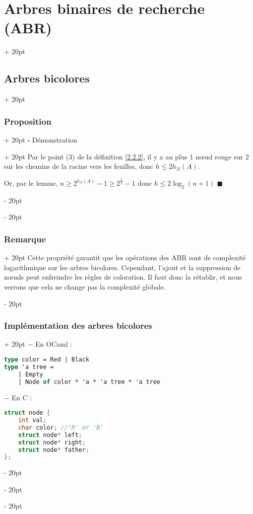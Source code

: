 \documentclass[a4paper, 12pt, twoside]{article}
\renewcommand{\le}{\leqslant}
\renewcommand{\ge}{\geqslant}
\newcommand{\ind}[1][20pt]{\advance\leftskip + #1}
\newcommand{\deind}[1][20pt]{\advance\leftskip - #1}
\newenvironment{indt}[2][20pt]{#2 \par \ind[#1]}{\par \deind} %
\begin{document}
\begin{indt}{\section{Arbres binaires de recherche (ABR)}}
\begin{indt}{\subsection{Arbres bicolores}}
\begin{indt}{\subsubsection{Proposition}}
\begin{indt}{$\square$ Démonstration}
                    Par le point (3) de la définition \ref{2.2.2}, il y a au plus 1 n\oe ud rouge sur 2 sur les chemins de la racine vers les feuilles, donc $h \le 2 h_N(A)$.
                    
                    Or, par le lemme, $n \ge 2^{h_N(A)} - 1 \ge 2^{\frac h 2} - 1$ donc $h \le 2\log_2(n + 1)$ $\blacksquare$
                \end{indt}
            \end{indt}
            
            \vspace{12pt}
            
            \begin{indt}{\subsubsection{Remarque}}
                Cette propriété garantit que les opérations des ABR sont de complexité logarithmique sur les arbres bicolores. Cependant, l'ajout et la suppression de n\oe uds peut enfreindre les règles de coloration. Il faut donc la rétablir, et nous verrons que cela ne change pas la complexité globale.
            \end{indt}
            
            \vspace{12pt}
            
            \begin{indt}{\subsubsection{Implémentation des arbres bicolores}}
                $-$ En OCaml :
                
                \begin{lstlisting}[language=Caml, xleftmargin=80pt]
type color = Red | Black
type 'a tree =
    | Empty
    | Node of color * 'a * 'a tree * 'a tree\end{lstlisting}
                
                \vspace{6pt}
                
                $-$ En C :
                
                \begin{lstlisting}[language=C, xleftmargin=80pt]
struct node {
    int val;
    char color; //'R' or 'B'
    struct node* left;
    struct node* right;
    struct node* father;
};


\end{lstlisting}
\end{indt}
\end{indt}
\end{indt}
\end{document}
